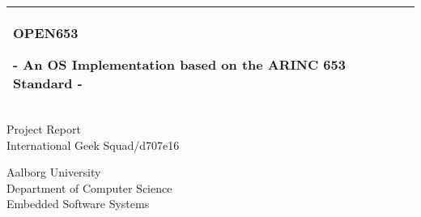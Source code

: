 %
\begin{titlepage}
	\addtolength{\hoffset}{0.5\evensidemargin-0.5\oddsidemargin} %
	\noindent%
	\begin{tabular}{@{}p{\textwidth}@{}}
		\toprule[2pt]
		\midrule
		\vspace{0.2cm}
		\begin{center}
			\Huge{\textbf{
				OPEN653
			}}
		\end{center}
		\begin{center}
			\Large{
				- An OS Implementation based on the ARINC 653 Standard -
			}
		\end{center}
		\vspace{0.2cm}\\
		\midrule
		\toprule[2pt]
	\end{tabular}
	\vspace{4 cm}
	\begin{center}
		{\large
			Project Report
		}\\
		\vspace{0.2cm}
		{\Large
			International Geek Squad/d707e16
		}
	\end{center}
	\vfill
	\begin{center}
		Aalborg University\\
		Department of Computer Science\\
		Embedded Software Systems
	\end{center}
\end{titlepage}
\clearpage
